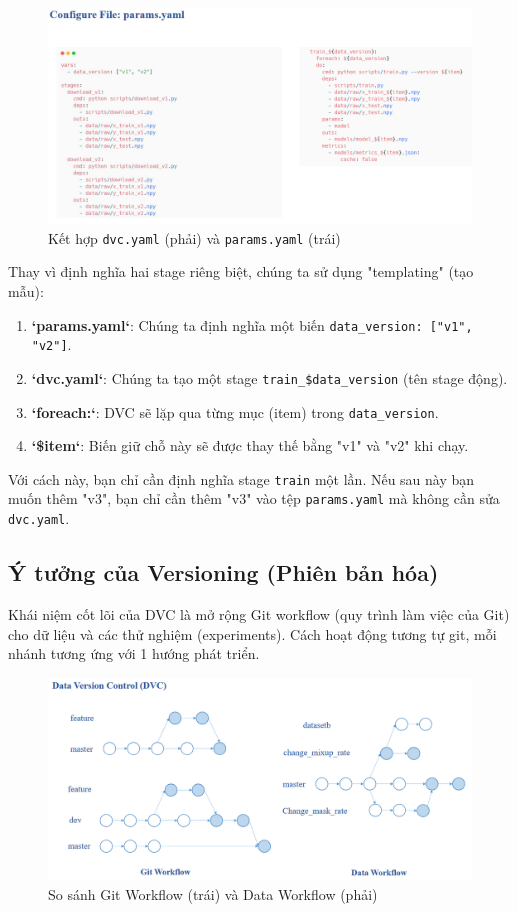 \documentclass[11pt]{article}
\begin{document}
\begin{figure}[H]
    \centering
    \includegraphics[width=1.0\linewidth]{images/auto3.png}
    \caption{Kết hợp \texttt{dvc.yaml} (phải) và \texttt{params.yaml} (trái)}
\end{figure}

Thay vì định nghĩa hai stage riêng biệt, chúng ta sử dụng "templating" (tạo mẫu):
\begin{enumerate}
    \item \textbf{`params.yaml`}: Chúng ta định nghĩa một biến \texttt{data\_version: ["v1", "v2"]}.
    \item \textbf{`dvc.yaml`}: Chúng ta tạo một stage \texttt{train\_\${data\_version}} (tên stage động).
    \item \textbf{`foreach:`}: DVC sẽ lặp qua từng mục (item) trong \texttt{data\_version}.
    \item \textbf{`\${item}`}: Biến giữ chỗ này sẽ được thay thế bằng "v1" và "v2" khi chạy.
\end{enumerate}
Với cách này, bạn chỉ cần định nghĩa stage \texttt{train} một lần. Nếu sau này bạn muốn thêm "v3", bạn chỉ cần thêm "v3" vào tệp \texttt{params.yaml} mà không cần sửa \texttt{dvc.yaml}.

\subsection{Ý tưởng của Versioning (Phiên bản hóa)}
Khái niệm cốt lõi của DVC là mở rộng Git workflow (quy trình làm việc của Git) cho dữ liệu và các thử nghiệm (experiments). Cách hoạt động tương tự git, mỗi nhánh tương ứng với 1 hướng phát triển. 

\begin{figure}[H]
    \centering
    \includegraphics[width=1.0\linewidth]{images/versoning.png}
    \caption{So sánh Git Workflow (trái) và Data Workflow (phải)}
\end{figure}
\end{document}
